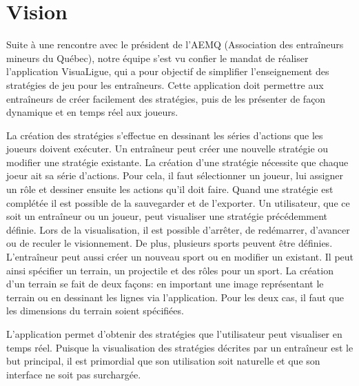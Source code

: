 
\chapter{Vision}
\label{s:vision}

Suite à une rencontre avec le président de l'AEMQ (Association des entraîneurs mineurs du Québec), notre équipe s'est vu confier le mandat de réaliser l'application VisuaLigue, qui a pour objectif de simplifier l'enseignement des stratégies de jeu pour les entraîneurs.
Cette application doit permettre aux entraîneurs de créer facilement des stratégies, puis de les présenter de façon dynamique et en temps réel aux joueurs.

La cr\'eation des strat\'egies s'effectue en dessinant les s\'eries d'actions que les joueurs doivent ex\'ecuter.
Un entraîneur peut créer une nouvelle stratégie ou modifier une stratégie existante.
La création d'une stratégie nécessite que chaque joeur ait sa série d'actions.
Pour cela, il faut s\'electionner un joueur, lui assigner un r\^ole et dessiner ensuite les actions qu'il doit faire.
Quand une strat\'egie est compl\'et\'ee il est possible de la sauvegarder et de l'exporter.
Un utilisateur, que ce soit un entraîneur ou un joueur, peut visualiser une strat\'egie pr\'ec\'edemment d\'efinie.
Lors de la visualisation, il est possible d'arr\^eter, de red\'emarrer, d'avancer ou de reculer le visionnement.
De plus, plusieurs sports peuvent \^etre d\'efinies.
L'entraîneur peut aussi créer un nouveau sport ou en modifier un existant.
Il peut ainsi sp\'ecifier un terrain, un projectile et des r\^oles pour un sport.
La création d'un terrain se fait de deux façons: en important une image représentant le terrain ou en dessinant les lignes via l'application.
Pour les deux cas, il faut que les dimensions du terrain soient spécifiées.

L'application permet d'obtenir des strat\'egies que l'utilisateur peut visualiser en temps r\'eel.
Puisque la visualisation des stratégies décrites par un entraîneur est le but principal, il est primordial que son utilisation soit naturelle et que son interface ne soit pas surchargée.
